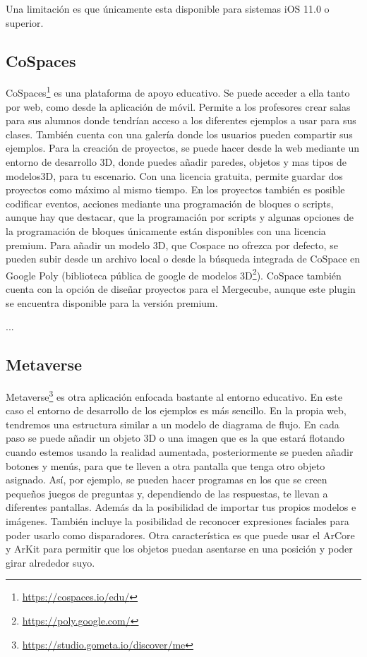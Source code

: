 Una limitación es que únicamente esta disponible para sistemas iOS 11.0 o superior.


\subsection{CoSpaces}\label{sub:Def_cospace} CoSpaces\footnote{\url{https://cospaces.io/edu/}} es una plataforma de apoyo educativo. Se puede acceder a ella tanto por web, como desde la aplicación de móvil. Permite a los profesores crear salas para sus alumnos donde tendrían acceso a los diferentes ejemplos a usar para sus clases. También cuenta con una galería donde los usuarios pueden compartir sus ejemplos.
Para la creación de proyectos, se puede hacer desde la web mediante un entorno de desarrollo 3D, donde puedes añadir paredes, objetos y mas tipos de modelos3D, para tu escenario. Con una licencia gratuita, permite guardar dos proyectos como máximo al mismo tiempo. En los proyectos también es posible codificar eventos, acciones mediante una programación de bloques o scripts, aunque hay que destacar, que la programación por scripts y algunas opciones de la programación de bloques únicamente están disponibles con una licencia premium. Para añadir un modelo 3D, que Cospace no ofrezca por defecto, se pueden subir desde un archivo local o desde la búsqueda integrada de CoSpace en Google Poly (biblioteca pública de google de modelos 3D\footnote{\url{https://poly.google.com/}}).
CoSpace también cuenta con la opción de diseñar proyectos para el Mergecube, aunque este plugin se encuentra disponible para la versión premium.

...

\subsection{Metaverse} Metaverse\footnote{\url{https://studio.gometa.io/discover/me}} es otra aplicación enfocada bastante al entorno educativo. En este caso el entorno de desarrollo de los ejemplos es más sencillo. En la propia web, tendremos una estructura similar a un modelo de diagrama de flujo. En cada paso se puede añadir un objeto 3D o una imagen que es la que estará flotando cuando estemos usando la realidad aumentada, posteriormente se pueden añadir botones y menús, para que te lleven a otra pantalla que tenga otro objeto asignado. Así, por ejemplo, se pueden hacer programas en los que se creen pequeños juegos de preguntas y, dependiendo de las respuestas, te llevan a diferentes pantallas.
Además da la posibilidad de importar tus propios modelos e imágenes.
También incluye la posibilidad de reconocer expresiones faciales para poder usarlo como disparadores.
Otra característica es que puede usar el ArCore y ArKit para permitir que los objetos puedan asentarse en una posición y poder girar alrededor suyo.

